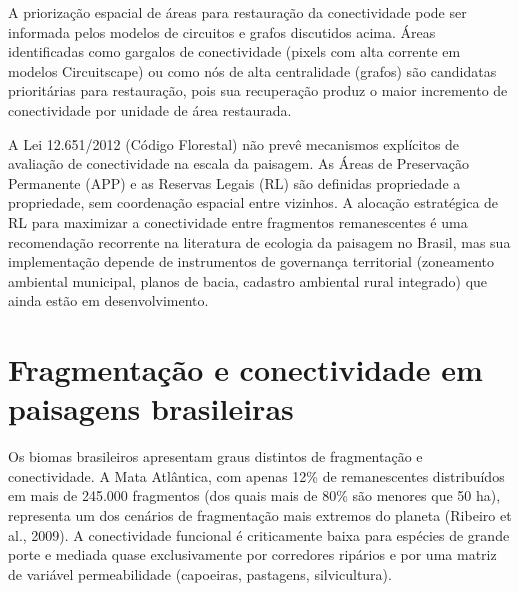 \documentclass[
  portuguese,
  11pt,
  a4paper,
  open=any]{scrbook}
\begin{document}
A priorização espacial de áreas para restauração da conectividade pode
ser informada pelos modelos de circuitos e grafos discutidos acima.
Áreas identificadas como gargalos de conectividade (pixels com alta
corrente em modelos Circuitscape) ou como nós de alta centralidade
(grafos) são candidatas prioritárias para restauração, pois sua
recuperação produz o maior incremento de conectividade por unidade de
área restaurada.

\begin{tcolorbox}[enhanced jigsaw, colbacktitle=quarto-callout-important-color!10!white, coltitle=black, opacityback=0, breakable, left=2mm, colback=white, bottomtitle=1mm, toptitle=1mm, titlerule=0mm, arc=.35mm, opacitybacktitle=0.6, leftrule=.75mm, colframe=quarto-callout-important-color-frame, title=\textcolor{quarto-callout-important-color}{\faExclamation}\hspace{0.5em}{Conectividade no Código Florestal brasileiro}, rightrule=.15mm, bottomrule=.15mm, toprule=.15mm]

A Lei 12.651/2012 (Código Florestal) não prevê mecanismos explícitos de
avaliação de conectividade na escala da paisagem. As Áreas de
Preservação Permanente (APP) e as Reservas Legais (RL) são definidas
propriedade a propriedade, sem coordenação espacial entre vizinhos. A
alocação estratégica de RL para maximizar a conectividade entre
fragmentos remanescentes é uma recomendação recorrente na literatura de
ecologia da paisagem no Brasil, mas sua implementação depende de
instrumentos de governança territorial (zoneamento ambiental municipal,
planos de bacia, cadastro ambiental rural integrado) que ainda estão em
desenvolvimento.

\end{tcolorbox}

\section{Fragmentação e conectividade em paisagens
brasileiras}\label{fragmentauxe7uxe3o-e-conectividade-em-paisagens-brasileiras}

Os biomas brasileiros apresentam graus distintos de fragmentação e
conectividade. A Mata Atlântica, com apenas 12\% de remanescentes
distribuídos em mais de 245.000 fragmentos (dos quais mais de 80\% são
menores que 50 ha), representa um dos cenários de fragmentação mais
extremos do planeta (Ribeiro et al., 2009). A conectividade funcional é
criticamente baixa para espécies de grande porte e mediada quase
exclusivamente por corredores ripários e por uma matriz de variável
permeabilidade (capoeiras, pastagens, silvicultura).
\end{document}
